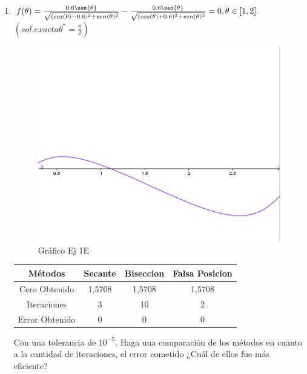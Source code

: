 \documentclass{udpreport}
\begin{document}
\begin{enumerate}
\begin{enumerate}
\begin{table}[H]
\begin{tabular} { |c|c|c|c|}
            \end{tabular}
        \end{table}
    \newpage
    \item $ f (\theta) = \frac{0.6\sen{\theta}}{\sqrt{(cos(\theta) - 0.6)^2 + sen(\theta)^2}} -  \frac{0.6\sen{\theta}}{\sqrt{(cos(\theta) + 0.6)^2 + sen(\theta)^2}} = 0, \theta \in [1,2].$
    $(sol. exacta \theta^* = \frac{\pi}{2})$
    
        \begin{figure}[H]
        \centering
        \includegraphics[width=11cm]{GraficoEj1e}
        \caption{Gráfico Ej 1E}
        \end{figure}
    
        \begin{table}[H]
        \centering
            \begin{tabular} { |c|c|c|c|}
            
            \hline
            Métodos       & Secante & Biseccion & Falsa Posicion \\
            \hline
            Cero Obtenido &  1,5708       &   1,5708       &      1,5708        \\
            \hline
            Iteraciones   &     3        &      10        &        2       \\
            \hline
            Error Obtenido  &   0        &      0      &          0  \\
            \hline
            
            \end{tabular}
        \end{table}
        
    Con una tolerancia de $ 10^{-5} $. Haga una comparación de los métodos en cuanto a la cantidad de iteraciones, el error cometido ¿Cuál de ellos fue más eficiente?
    

\end{enumerate}
\end{enumerate}
\end{document}
